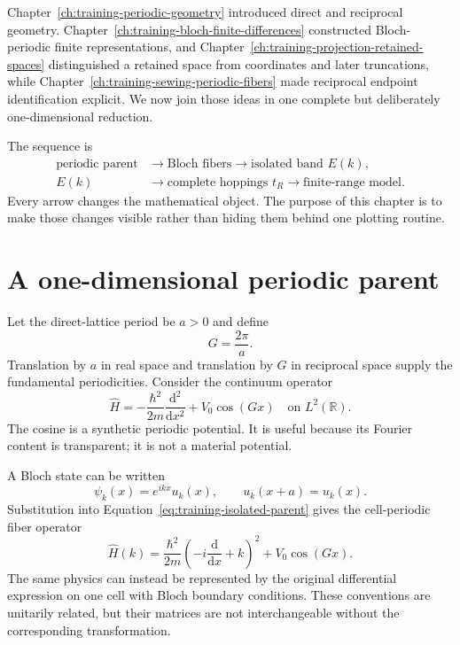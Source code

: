 Chapter~\ref{ch:training-periodic-geometry} introduced direct and reciprocal
geometry. Chapter~\ref{ch:training-bloch-finite-differences} constructed
Bloch-periodic finite representations, and
Chapter~\ref{ch:training-projection-retained-spaces} distinguished a retained
space from coordinates and later truncations, while
Chapter~\ref{ch:training-sewing-periodic-fibers} made reciprocal endpoint
identification explicit. We now join those ideas in one complete but
deliberately one-dimensional reduction.

The sequence is
\begin{equation}
  \begin{aligned}
    \text{periodic parent}
    &\longrightarrow \text{Bloch fibers}
     \longrightarrow \text{isolated band }E(k),\\
    E(k)
    &\longrightarrow \text{complete hoppings }t_R
     \longrightarrow \text{finite-range model}.
  \end{aligned}
  \label{eq:training-isolated-reduction-sequence}
\end{equation}
Every arrow changes the mathematical object. The purpose of this chapter is to
make those changes visible rather than hiding them behind one plotting routine.

\section{A one-dimensional periodic parent}

Let the direct-lattice period be $a>0$ and define
\begin{equation}
  G=\frac{2\pi}{a}.
  \label{eq:training-isolated-reciprocal-vector}
\end{equation}
Translation by $a$ in real space and translation by $G$ in reciprocal space
supply the fundamental periodicities. Consider the continuum operator
\begin{equation}
  \widehat H
  =-\frac{\hbar^2}{2m}\frac{\mathrm d^2}{\mathrm d x^2}
   +V_0\cos(Gx)
  \quad\text{on }L^2(\mathbb R).
  \label{eq:training-isolated-parent}
\end{equation}
The cosine is a synthetic periodic potential. It is useful because its Fourier
content is transparent; it is not a material potential.

A Bloch state can be written
\begin{equation}
  \psi_k(x)=e^{ikx}u_k(x),
  \qquad
  u_k(x+a)=u_k(x).
  \label{eq:training-isolated-bloch-factorization}
\end{equation}
Substitution into Equation~\eqref{eq:training-isolated-parent} gives the
cell-periodic fiber operator
\begin{equation}
  \widehat H(k)
  =\frac{\hbar^2}{2m}
   \left(-i\frac{\mathrm d}{\mathrm d x}+k\right)^2
   +V_0\cos(Gx).
  \label{eq:training-isolated-fiber}
\end{equation}
The same physics can instead be represented by the original differential
expression on one cell with Bloch boundary conditions. These conventions are
unitarily related, but their matrices are not interchangeable without the
corresponding transformation.

